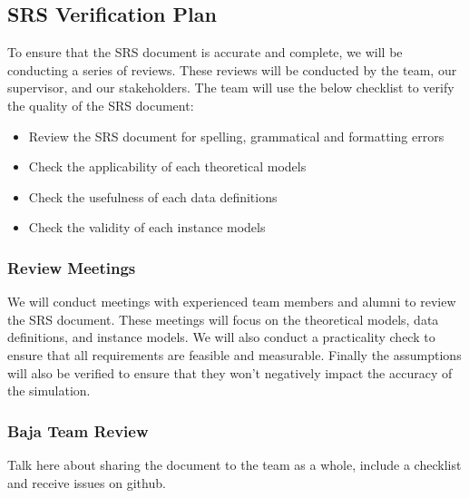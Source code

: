 \documentclass[12pt, titlepage]{article}
\begin{document}
\subsection{SRS Verification Plan}




\noindent To ensure that the SRS document is accurate and complete, we will be conducting a series of reviews.
These reviews will be conducted by the team, our supervisor, and our stakeholders.
The team will use the below checklist to verify the quality of the SRS document:
\begin{itemize}
  \item Review the SRS document for spelling, grammatical and formatting errors
  \item Check the applicability of each theoretical models
  \item Check the usefulness of each data definitions
  \item Check the validity of each instance models
\end{itemize}

\subsubsection*{Review Meetings}
We will conduct meetings with experienced team members and alumni to review the SRS document.
These meetings will focus on the theoretical models, data definitions, and instance models.
We will also conduct a practicality check to ensure that all requirements are feasible and measurable.
Finally the assumptions will also be verified to ensure that they won't negatively impact the accuracy of the simulation.

\subsubsection*{Baja Team Review}
Talk here about sharing the document to the team as a whole, include a checklist and receive issues on github.
\end{document}
